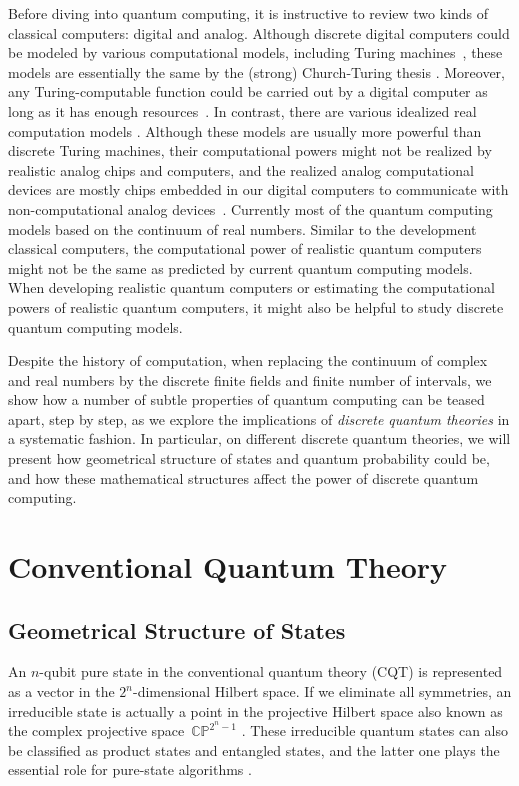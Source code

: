 \documentclass[twoside]{iuphd}
\begin{document}
Before diving into quantum computing, it is instructive to review
two kinds of classical computers: digital and analog. Although discrete
digital computers could be modeled by various computational models,
including Turing machines~\cite{Turing_1937}, these models are essentially
the same by the (strong) Church-Turing thesis \cite{Church_1936,Turing_1937,Kleene_1943}.
Moreover, any Turing-computable function could be carried out by a
digital computer as long as it has enough resources~\cite{Piccinini2015}.
In contrast, there are various idealized real computation models \cite{Siegelmann1998,Ziegler2007,weihrauch2012computable,blum2012complexity}.
Although these models are usually more powerful than discrete Turing
machines, their computational powers might not be realized by realistic
analog chips and computers, and the realized analog computational
devices are mostly chips embedded in our digital computers to communicate
with non-computational analog devices~\cite{Camenzind2005}. Currently
most of the quantum computing models based on the continuum of real
numbers. Similar to the development classical computers, the computational
power of realistic quantum computers might not be the same as predicted
by current quantum computing models. When developing realistic quantum
computers or estimating the computational powers of realistic quantum
computers, it might also be helpful to study discrete quantum computing
models.

Despite the history of computation, when replacing the continuum of
complex and real numbers by the discrete finite fields and finite
number of intervals, we show how a number of subtle properties of
quantum computing can be teased apart, step by step, as we explore
the implications of \emph{discrete quantum theories} in a systematic
fashion. In particular, on different discrete quantum theories, we
will present how geometrical structure of states and quantum probability
could be, and how these mathematical structures affect the power of
discrete quantum computing. 

\chapter{Conventional Quantum Theory}

\section{Geometrical Structure of States}

An $n$-qubit pure state in the conventional quantum theory (CQT)
is represented as a vector in the $2^{n}$-dimensional Hilbert space.
If we eliminate all symmetries, an irreducible state is actually a
point in the projective Hilbert space \cite{MosseriDandoloff2001,Jaeger2007}
also known as the complex projective space~$\mathbb{CP}^{2^{n}-1}$
\cite{Hatcher2001,Bengtsson2007}. These irreducible quantum states
can also be classified as product states and entangled states, and
the latter one plays the essential role for pure-state algorithms
\cite{Mermin2007,Jaeger2007}.
\end{document}
